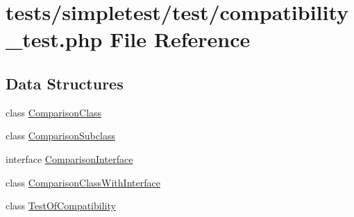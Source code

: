 \hypertarget{compatibility__test_8php}{\section{tests/simpletest/test/compatibility\-\_\-test.php File Reference}
\label{compatibility__test_8php}
}
\subsection*{Data Structures}
\begin{DoxyCompactItemize}
\item 
class \hyperlink{class_comparison_class}{Comparison\-Class}
\item 
class \hyperlink{class_comparison_subclass}{Comparison\-Subclass}
\item 
interface \hyperlink{interface_comparison_interface}{Comparison\-Interface}
\item 
class \hyperlink{class_comparison_class_with_interface}{Comparison\-Class\-With\-Interface}
\item 
class \hyperlink{class_test_of_compatibility}{Test\-Of\-Compatibility}
\end{DoxyCompactItemize}
